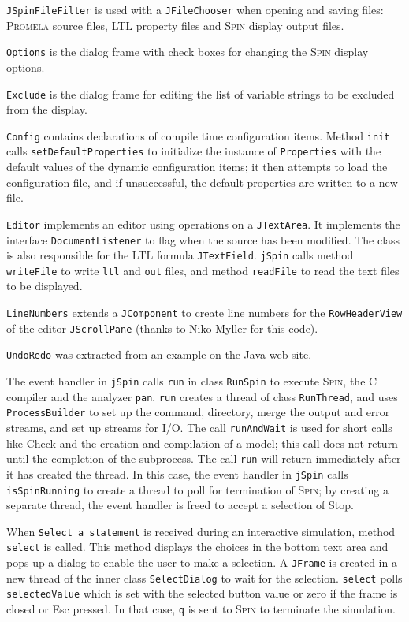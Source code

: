 \documentclass[11pt]{article}
\newcommand{\spn}{\textsc{Spin}}
\newcommand{\prm}{\textsc{Promela}}
\newcommand{\p}[1]{\texttt{#1}}
\newcommand{\bu}[1]{\textsf{#1}}
\begin{document}
\p{JSpinFileFilter} is used with a \p{JFileChooser}
when opening and saving files: \prm{} source files,
LTL property files and \spn{} display output files.

\p{Options} is the dialog frame with check boxes for
changing the \spn{} display options.

\p{Exclude} is the dialog frame for editing the list
of variable strings to be excluded from the display.

\p{Config} contains declarations of compile time configuration items.
Method \p{init} calls \p{set\-Default\-Properties} to initialize the instance
of \p{Properties} with the default values of the dynamic configuration
items; it then attempts to load the configuration file, and if unsuccessful,
the default properties are written to a new file.

\p{Editor} implements an editor using operations on a
\p{JTextArea}. It implements the interface \p{Document\-Listener} to flag
when the source has been modified. The class is also responsible
for the LTL formula \p{JTextField}. \p{jSpin} calls method \p{writeFile}
to write \p{ltl} and \p{out} files, and method \p{readFile} to read
the text files to be displayed.

\p{LineNumbers} extends a \p{JComponent} to create line numbers
for the \p{RowHeaderView} of the editor \p{JScrollPane}
(thanks to Niko Myller for this code).

\p{UndoRedo} was extracted from an example on the Java web site.

The event handler in \p{jSpin} calls \p{run} in class \p{RunSpin}
to execute \spn{}, the C compiler and the analyzer \p{pan}.
\p{run} creates a thread of class \p{RunThread},
and uses \p{ProcessBuilder} to set up the
command, directory, merge the output and error streams,
and set up streams for I/O.
The call \p{runAndWait} is used for short calls like \bu{Check}
and the creation and compilation of a model;
this call does not return until the completion of the subprocess.
The call \p{run} will return immediately after it has created the thread.
In this case, the event handler in \p{jSpin} calls \p{isSpinRunning}
to create a thread to poll for termination of \spn{};
by creating a separate thread, the event handler is freed to accept
a selection of \bu{Stop}.

When \p{Select a statement} is received during an interactive simulation,
method \p{select} is called.
This method displays the choices in the bottom text area and pops up a
dialog to enable the user to make a selection.
A \p{JFrame} is created in a new thread of the inner class \p{SelectDialog} to wait
for the selection.
\p{select} polls \p{selectedValue} which is set with the selected button
value or zero if the frame is closed or \bu{Esc} pressed.
In that case, \p{q} is sent to \spn{} to terminate the simulation.
\end{document}
